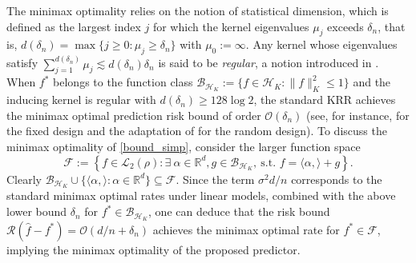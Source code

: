 \documentclass[11pt,twoside]{article}
\def\RR{\mathbb{R}}
\def\cO{\mathcal{O}}
\def\cH{\mathcal H}
\def\cR{\mathcal R}
\def\cF{\mathcal F}
\def\cL{\mathcal L}
\def\cB{\mathcal B}
\def\wh{\widehat}
\def\i{\infty}
\def\l{\left}
\def\r{\right}
\begin{document}
\begin{remark}
The minimax optimality relies on the notion of statistical dimension, which is defined as the largest index $j$ for which the kernel eigenvalues $\mu_j$
   exceeds $\delta_n$, that is, $d(\delta_n) = \max\{j\ge 0:   \mu_j \ge \delta_n\}$ with $\mu_0:=\i$.  Any kernel whose eigenvalues satisfy $\sum_{j=1}^{d(\delta_n)} \mu_j \lesssim d(\delta_n)\delta_n$ is said to be {\em regular}, a notion introduced in \cite{yang2017randomized}.
   When $f^*$ belongs to the function class $\cB_{\cH_K}:= \{f \in \cH_K : \|f\|_K^2 \le 1\}$  and the inducing kernel is 
   regular with $d(\delta_n)\ge 128\log 2$, the standard KRR achieves the minimax optimal prediction risk bound of order $\cO(\delta_n)$ (see,  for instance, \citet[Theorem 2]{yang2017randomized} for the fixed design and the adaptation of \citet[Theorem 2]{bing2025kernel} for the random design). To discuss the minimax optimality of \eqref{bound_simp},   consider  the larger function space 
    $$
        \cF := \l\{f\in \cL_2(\rho): \exists~  \alpha\in\RR^d, g\in\cB_{\cH_K}, ~ \text{s.t. } f = \langle \alpha, \rangle + g\r\}.
    $$
    Clearly $\cB_{\cH_K} \cup \{\langle \alpha,\rangle: \alpha \in \RR^d\} \subseteq \cF$. Since the term $\sigma^2 d/n$ corresponds to the standard minimax optimal rates under linear models, combined with the above lower bound $\delta_n$ for $f^*\in \cB_{\cH_K}$, one can deduce that the risk bound $\cR(\wh f-f^*) = \cO(d/n + \delta_n)$ achieves the minimax optimal rate for $f^*\in \cF$, implying the minimax optimality of the proposed predictor. 
\end{remark}
\end{document}
